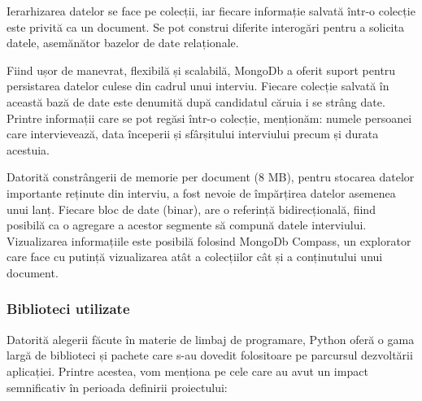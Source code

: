\documentclass[a4paper, 12pt]{report}
\begin{document}
	Ierarhizarea datelor se face pe colecții, iar fiecare informație salvată într-o colecție este privită ca un document. Se pot construi diferite interogări pentru a solicita datele, asemănător bazelor de date relaționale.
	
	Fiind ușor de manevrat, flexibilă și scalabilă, MongoDb a oferit suport pentru persistarea datelor culese din cadrul unui interviu. Fiecare colecție salvată în această bază de date este denumită după candidatul căruia i se strâng date. Printre informații care se pot regăsi într-o colecție, menționăm: numele persoanei care intervievează, data începerii și sfârșitului interviului precum și durata acestuia. 
	
	Datorită constrângerii de memorie per document (8 MB), pentru stocarea datelor importante reținute din interviu, a fost nevoie de împărțirea datelor asemenea unui lanț. Fiecare bloc de date (binar), are o referință bidirecțională, fiind posibilă ca o agregare a acestor segmente să compună datele interviului. Vizualizarea informațiile este posibilă folosind MongoDb Compass, un explorator care face cu putință vizualizarea atât a colecțiilor cât și a conținutului unui document.
	
	\subsubsection{Biblioteci utilizate}
	Datorită alegerii făcute în materie de limbaj de programare, Python oferă o gama largă de biblioteci și pachete care s-au dovedit folositoare pe parcursul dezvoltării aplicației. Printre acestea, vom menționa pe cele care au avut un impact semnificativ în perioada definirii proiectului: 
	
\end{document}
